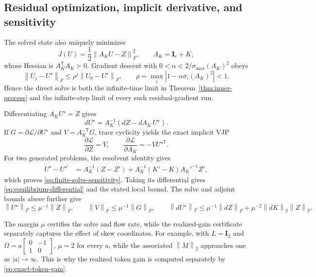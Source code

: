 \documentclass[10pt]{article}
\newcommand{\I}{\mathbf{I}}
\newcommand{\T}{\mathsf{T}}
\newcommand{\norm}[1]{\left\lVert #1 \right\rVert}
\begin{document}
\subsection{Residual optimization, implicit derivative, and sensitivity}

The solved state also uniquely minimizes
\begin{equation}
    J(U)=\frac12\norm{A_KU-Z}_F^2,
    \qquad A_K=\I_r+K,
\label{eq:residual-objective}
\end{equation}
whose Hessian is $A_K^\T A_K\succ0$.  Gradient descent with
$0<\alpha<2/\sigma_{\max}(A_K)^2$ obeys
\begin{equation}
    \norm{U_j-U^\star}_F
    \leq\rho^j\norm{U_0-U^\star}_F,
    \qquad
    \rho=\max_i|1-\alpha\sigma_i(A_K)^2|<1.
\end{equation}
Hence the direct solve is both the infinite-time limit in
Theorem~\ref{thm:inner-process} and the infinite-step limit of every such
residual-gradient run.

Differentiating $A_KU^\star=Z$ gives
\begin{equation}
    dU^\star=A_K^{-1}(dZ-dA_K\,U^\star).
\label{eq:equilibrium-differential}
\end{equation}
If $G=\partial\mathcal L/\partial U^\star$ and $V=A_K^{-\T}G$, trace
cyclicity yields the exact implicit VJP
\begin{equation}
    \frac{\partial\mathcal L}{\partial Z}=V,
    \qquad
    \frac{\partial\mathcal L}{\partial A_K}=-VU^{\star\T}.
\label{eq:implicit-vjp}
\end{equation}
For two generated problems, the resolvent identity gives
\begin{align}
    U^\star-U^{\star'}
    &=A_K^{-1}(Z-Z')
      +A_K^{-1}(K'-K)A_K'^{-1}Z',
\end{align}
which proves \eqref{eq:finite-solve-sensitivity}.  Taking its differential
gives \eqref{eq:equilibrium-differential} and the stated local bound.
The solve and adjoint bounds above further give
\begin{equation}
    \norm{U^\star}_F\leq\mu^{-1}\norm{Z}_F,
    \qquad
    \norm{V}_F\leq\mu^{-1}\norm{G}_F,
    \qquad
    \norm{dU^\star}_F
    \leq\mu^{-1}\norm{dZ}_F
      +\mu^{-2}\norm{dK}_2\norm{Z}_F.
\end{equation}

The margin $\mu$ certifies the solve and flow rate, while the realized-gain
certificate separately captures the effect of skew coordinates.  For example,
with $L=\I_2$ and
$\Omega=a\left[\begin{smallmatrix}0&-1\\1&0\end{smallmatrix}\right]$,
$\mu=2$ for every $a$, while the associated $\norm{M}_2$ approaches one as
$|a|\to\infty$.  This is why the realized token gain is computed separately
by \eqref{eq:exact-token-gain}.
\end{document}
